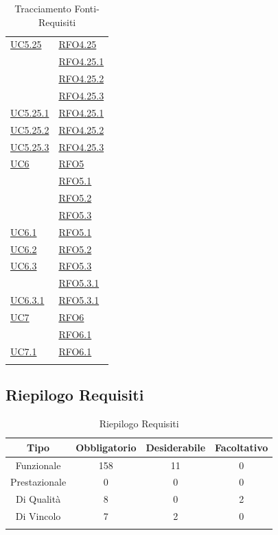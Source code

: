 \begin{longtable}{|>{\centering}m{5cm}|m{5cm}<{\centering}|}
\hyperref[UC5.25]{UC5.25} & \hyperlink{RFO4.25}{RFO4.25}\\ 
& \hyperlink{RFO4.25.1}{RFO4.25.1}\\ 
& \hyperlink{RFO4.25.2}{RFO4.25.2}\\ 
& \hyperlink{RFO4.25.3}{RFO4.25.3}\\ \hline 
\hyperref[UC5.25.1]{UC5.25.1} & \hyperlink{RFO4.25.1}{RFO4.25.1}\\\hline
\hyperref[UC5.25.2]{UC5.25.2} & \hyperlink{RFO4.25.2}{RFO4.25.2}\\\hline
\hyperref[UC5.25.3]{UC5.25.3} & \hyperlink{RFO4.25.3}{RFO4.25.3}\\\hline

\hyperref[UC6]{UC6} & \hyperlink{RFO5}{RFO5}\\ 
 & \hyperlink{RFO5.1}{RFO5.1}\\ 
 & \hyperlink{RFO5.2}{RFO5.2}\\ 
 & \hyperlink{RFO5.3}{RFO5.3}\\ \hline
 \hyperref[UC6.1]{UC6.1} & \hyperlink{RFO5.1}{RFO5.1}\\ \hline
 \hyperref[UC6.2]{UC6.2} & \hyperlink{RFO5.2}{RFO5.2}\\ \hline
 \hyperref[UC6.3]{UC6.3} & \hyperlink{RFO5.3}{RFO5.3}\\ 
 & \hyperlink{RFO5.3.1}{RFO5.3.1}\\ \hline
  \hyperref[UC6.3.1]{UC6.3.1} & \hyperlink{RFO5.3.1}{RFO5.3.1}\\ \hline
\hyperref[UC7]{UC7} & \hyperlink{RFO6}{RFO6}\\ 
& \hyperlink{RFO6.1}{RFO6.1}\\ \hline
\hyperref[UC7.1]{UC7.1} & \hyperlink{RFO6.1}{RFO6.1}\\ \hline

\caption[Tracciamento Fonti-Requisiti]{Tracciamento Fonti-Requisiti}
\label{tabella:fonti-requi}
\end{longtable}
\clearpage

\subsection{Riepilogo Requisiti}
\normalsize
\begin{longtable}{|c|c|c|c|}
\hline 
\textbf{Tipo} & \textbf{Obbligatorio} & \textbf{Desiderabile} & \textbf{Facoltativo}\\
\hline
Funzionale & 158 & 11 & 0\\ \hline
Prestazionale & 0 & 0 & 0\\ \hline
Di Qualità & 8 & 0 & 2\\ \hline
Di Vincolo & 7 & 2 & 0\\ \hline
\caption[Riepilogo Requisiti]{Riepilogo Requisiti}
\label{tabella:riepilogorequi}
\end{longtable}
\clearpage
\clearpage



